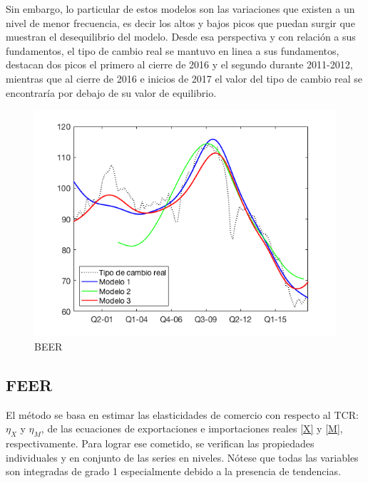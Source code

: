 \documentclass[12pt,letterpaper]{article}
\begin{document}
Sin embargo, lo particular de estos modelos son las variaciones que existen a un nivel de menor frecuencia, es decir los altos y bajos picos que puedan surgir que muestran el desequilibrio del modelo. Desde esa perspectiva y con relación a sus fundamentos, el tipo de cambio real se mantuvo en linea a sus fundamentos, destacan dos picos el primero al cierre de 2016 y el segundo durante 2011-2012, mientras que al cierre de 2016 e inicios de 2017 el valor del tipo de cambio real se encontraría por debajo de su valor de equilibrio.   

\begin{figure}
\centering
\caption{BEER}
\includegraphics[scale=0.6]{fig19}
\end{figure}













\subsection*{FEER}

El método se basa en estimar las elasticidades de comercio con respecto al TCR: $\eta_X$ y $\eta_M$, de las ecuaciones de exportaciones e importaciones reales \ref{X} y \ref{M}, respectivamente. Para lograr ese cometido, se verifican las propiedades individuales y en conjunto de las series en niveles. Nótese que todas las variables son integradas de grado 1 especialmente debido a la presencia de tendencias.
\end{document}
